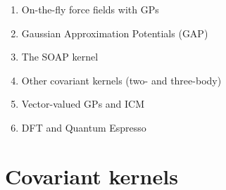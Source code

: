 \documentclass[%
reprint,
amsmath,amssymb,
aps,
]{revtex4-1}
\begin{document}
\begin{enumerate}

\item On-the-fly force fields with GPs \cite{li2015molecular, botu2015adaptive, botu2015learning}

\item Gaussian Approximation Potentials (GAP)
\cite{bartok2010gaussian, bartok2015gaussian, deringer2017machine}

\item The SOAP kernel \cite{bartok2013representing}

\item Other covariant kernels (two- and three-body) \cite{deringer2017machine, bartok2015gaussian, glielmo2017accurate, glielmo2018efficient}

\item Vector-valued GPs and ICM \cite{alvarez2012kernels}

\item DFT and Quantum Espresso \cite{kohn1999nobel, giannozzi2009quantum}

\end{enumerate}

\section{Covariant kernels}
\end{document}
